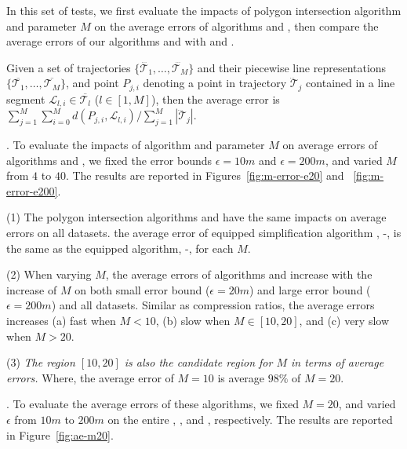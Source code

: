 In this set of tests, we first evaluate the impacts of polygon intersection algorithm \rpia and parameter $M$ on the average errors of algorithms \cist and \cista, then compare the average errors of our algorithms \cist and \cista with \dpa and \squishe.

Given a set of trajectories $\{\dddot{\mathcal{T}_1}, \ldots, \dddot{\mathcal{T}_M}\}$ and their piecewise line representations $\{\overline{\mathcal{T}_1}, \ldots, \overline{\mathcal{T}_M}\}$, and point $P_{j,i}$ denoting
a point in trajectory $\dddot{\mathcal{T}}_j$ contained in a line segment $\mathcal{L}_{l,i}\in\overline{\mathcal{T}_l}$ ($l\in[1,M]$),
then the average error is $\sum_{j=1}^{M}\sum_{i=0}^{M} d(P_{j,i},
\mathcal{L}_{l,i})/\sum_{j=1}^{M}{|\dddot{\mathcal{T}}_j |}$.


.
To evaluate the impacts of algorithm \rpia and parameter $M$ on average errors of algorithms \cist and \cista, we fixed the error bounds \textcolor[rgb]{1.00,0.00,0.00}{$\epsilon =10m$} and $\epsilon =200m$, and varied $M$ from $4$ to $40$.
The results are reported in Figures~\ref{fig:m-error-e20} and ~\ref{fig:m-error-e200}.


\ni(1) The polygon intersection algorithms \rpia and \cpia have the same impacts on average errors on all datasets. \eg the average error of \rpia equipped simplification algorithm \cist, \ie \cist-\rpia, is the same as the \cpia equipped algorithm, \ie \cist-\cpia, for each $M$.


\ni(2) When varying $M$, the average errors of algorithms \cist and \cista increase with the increase of $M$ on both small error bound \textcolor[rgb]{1.00,0.00,0.00}{(\eg $\epsilon = 20m$)} and large error bound (\eg $\epsilon = 200m$) and all datasets.
Similar as compression ratios, the average errors increases (a) fast when $M < 10$, (b) slow when $M \in [10, 20]$, and (c) very slow when $M  > 20$.


\ni(3) \emph{The region $[10, 20]$ is also the candidate region for $M$ in terms of average errors.}
Where, the average error of $M=10$ is average \textcolor[rgb]{1.00,0.00,0.00}{$98\%$} of $M=20$.




.
To evaluate the average errors of these algorithms, we fixed $M=20$, and varied $\epsilon$ from $10m$ to $200m$ on the entire \truck, \sercar, \geolife and \pricar, respectively.
The results are reported in Figure~\ref{fig:ae-m20}. %

